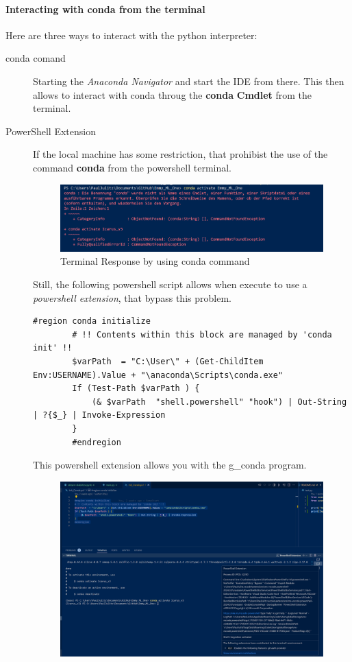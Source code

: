 \paragraph{Interacting with conda from the terminal}
Here are three ways to interact with the python interpreter:
\begin{description}
	\item[conda comand] Starting the \textit{Anaconda Navigator} and start the \gls{IDE} from there. This then allows to interact with conda throug the \textbf{conda} \textbf{Cmdlet} from the terminal.
	
	\item[PowerShell Extension] If the local machine has some restriction, that prohibist the use of the command \textbf{conda} from the powershell terminal.
	\begin{figure}[H]
		\centering
		\includegraphics[scale = 0.3]{attachment/chapter_AML/Scc023}
		\caption{Terminal Response by using conda command}
	\end{figure}
	Still, the following powershell script allows when execute to use a \textit{powershell extension}, that bypass this problem.
	\begin{lstlisting}[language=iCMD, caption={.ps1 script}, captionpos=b]
		#region conda initialize
		# !! Contents within this block are managed by 'conda init' !!
		$varPath  = "C:\User\" + (Get-ChildItem Env:USERNAME).Value + "\anaconda\Scripts\conda.exe"
		If (Test-Path $varPath ) {
			(& $varPath  "shell.powershell" "hook") | Out-String | ?{$_} | Invoke-Expression
		}
		#endregion
	\end{lstlisting}
	This powershell extension allows you with the \gls{g_conda} program.
	\begin{figure}[H]
		\centering
		\includegraphics[scale = 0.2]{attachment/chapter_AML/Scc026}

\end{figure}
\end{description}
